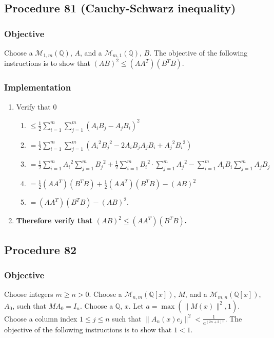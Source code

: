 \documentclass[twocolumn]{article}
\begin{document}
		\subsection{Procedure 81 (Cauchy-Schwarz inequality)}\label{sec:procedure 81}
			\subsubsection{Objective}
				Choose a $\mathcal{M}_{1,m}(\mathbb{Q})$, $A$, and a $\mathcal{M}_{m,1}(\mathbb{Q})$, $B$. The objective of the following instructions is to show that $(AB)^2\le(AA^T)(B^TB)$.
			\subsubsection{Implementation}
				\begin{enumerate}
					\item Verify that $0$
					\begin{enumerate}
						\item $\le\frac{1}{2}\sum_{i=1}^m\sum_{j=1}^m (A_iB_j-A_jB_i)^2$
						\item $=\frac{1}{2}\sum_{i=1}^m\sum_{j=1}^m ({A_i}^2{B_j}^2-2A_iB_jA_jB_i+{A_j}^2{B_i}^2)$
						\item $=\frac{1}{2}\sum_{i=1}^m {A_i}^2\sum_{j=1}^m {B_j}^2+\frac{1}{2}\sum_{i=1}^m {B_i}^2\cdot\allowbreak\sum_{j=1}^m {A_j}^2-\sum_{i=1}^m A_iB_i\sum_{j=1}^m A_jB_j$
						\item $=\frac{1}{2}(AA^T)(B^TB)+\frac{1}{2}(AA^T)(B^TB)-(AB)^2$
						\item $=(AA^T)(B^TB)-(AB)^2$.
					\end{enumerate}
					\item \textbf{Therefore verify that $(AB)^2\le(AA^T)(B^TB)$.}
				\end{enumerate}
		\subsection{Procedure 82}\label{sec:procedure 82}
			\subsubsection{Objective}
				Choose integers $m\ge n>0$. Choose a $\mathcal{M}_{n,m}(\mathbb{Q}[x])$, $M$, and a $\mathcal{M}_{m,n}(\mathbb{Q}[x])$, $A_0$, such that $MA_0=I_n$. Choose a $\mathbb{Q}$, $x$. Let $a=\max(\lVert M(x)\rVert^2,1)$. Choose a column index $1\le j\le n$ such that $\lVert A_n(x)e_j\rVert^2<\frac{1}{a^{(2n+2)!!}}$. The objective of the following instructions is to show that $1<1$.
\end{document}
